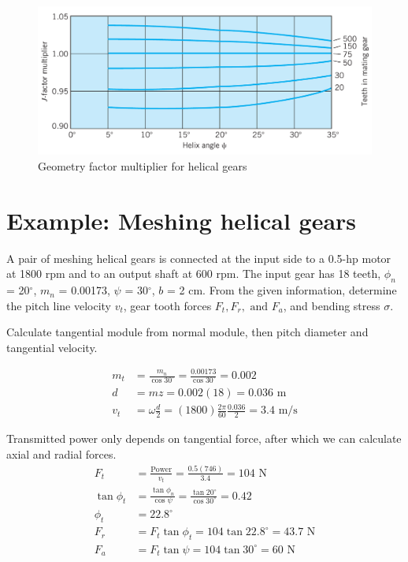 \documentclass[a4paper,openany]{tufte-book}
\begin{document}
\begin{figure}[htbp]
\centering
\includegraphics[width=.9\linewidth]{./pictures/Gears/geometry-factor-multiplier-helical.png}
\caption{\label{fig: factor multiplier}Geometry factor multiplier for helical gears}
\end{figure}

\section{Example: Meshing helical gears}
\label{sec:orgd6661e8}

A pair of meshing helical gears is connected at the input side to a 0.5-hp motor at 1800 rpm and to an output shaft at 600 rpm. The input gear has 18 teeth, \(\phi_{n}\) = 20\(^{\circ}\), \(m_{n}\) = 0.00173, \(\psi\) = 30\(^{\circ}\), \(b\) = 2 cm. From the given information, determine the pitch line velocity \(v_{t}\), gear tooth forces \(F_{t}, F_{r}, \text{ and } F_{a}\), and bending stress \(\sigma\).

Calculate tangential module from normal module, then pitch diameter and tangential velocity.

\begin{align*}
  m_{t} &= \frac{m_{n}}{\cos 30^{\circ}} = \frac{0.00173}{\cos 30^{\circ}} = 0.002 \\
  d &= mz = 0.002(18) = 0.036 \text{ m} \\
  v_{t} &= \omega \frac{d}{2}  = (1800) \frac{2\pi}{60} \frac{0.036}{2} = 3.4 \text{ m/s}
\end{align*}

Transmitted power only depends on tangential force, after which we can calculate axial and radial forces.
\begin{align*}
  F_{t} &= \frac{\text{Power}}{v_{t}} = \frac{0.5(746)}{3.4} = 104 \text{ N} \\
  \tan \phi_{t} &= \frac{\tan \phi_{n}}{\cos \psi} = \frac{\tan 20^{\circ}}{\cos 30^{\circ}} = 0.42 \\
  \phi_{t} &= 22.8^{\circ} \\
  F_{r} &= F_{t}\tan \phi_{t} = 104 \tan 22.8^{\circ} = 43.7 \text{ N} \\
  F_{a} &= F_{t} \tan \psi = 104 \tan 30^{\circ} = 60 \text{ N}
\end{align*}
\end{document}
